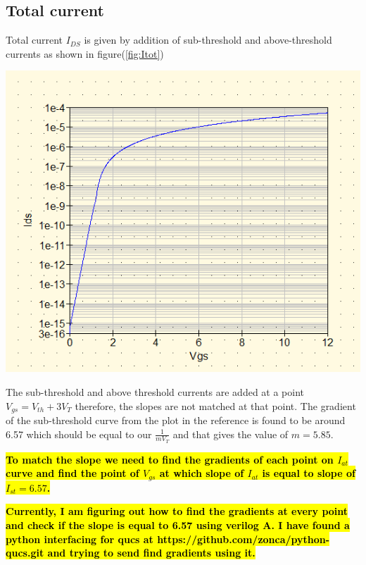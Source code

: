 \documentclass{article}
\begin{document}
\subsection{Total current}
Total current $I_{DS}$ is given by addition of sub-threshold and above-threshold currents as shown in figure(\ref{fig:Itot})
\begin{center}
    \label{fig:Itot}
    \includegraphics[scale=1]{../Images/22072024/Ids-total.png}
\end{center}

The sub-threshold and above threshold currents are added at a point  $V_{gs} = V_{th}+3V_T$ therefore, the slopes are not matched at that point. The gradient of the sub-threshold curve from the plot in the reference is found to be around 6.57 which should be equal to our $\frac{1}{m V_T}$ and that gives the value of $m = 5.85$. 

\hl{\textbf{To match the slope we need to find the gradients of each point on $I_{at}$ curve and find the point of $V_{gs}$ at which slope of $I_{at}$ is equal to slope of $I_{st} = 6.57$.  }}

\hl{\textbf{Currently, I am figuring out how to find the gradients at every point and check if the slope is equal to 6.57 using verilog A. I have found a python interfacing for qucs at https://github.com/zonca/python-qucs.git and trying to send find gradients using it. }}
\end{document}
